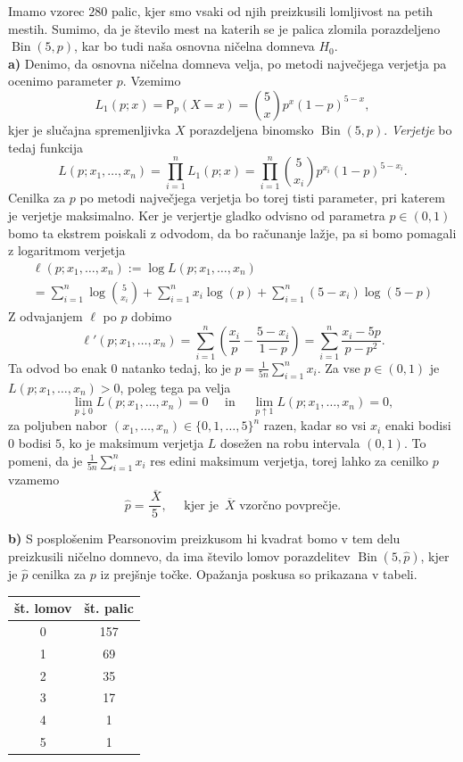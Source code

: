 \documentclass[a4paper,11pt]{article}
\newcommand{\olsi}[1]{\,\overline{\!{#1}}} %
\newcommand{\sumin}{\sum_{i = 1}^n}
\DeclareMathOperator{\bin}{Bin}
\begin{document}
Imamo vzorec $280$ palic, kjer smo vsaki od njih preizkusili lomljivost na petih mestih. Sumimo, da je število mest na katerih se je palica zlomila porazdeljeno $\bin(5,p)$, kar bo tudi naša osnovna ničelna domneva $H_0$.
\\

\noindent
\textbf{a)} Denimo, da osnovna ničelna domneva velja, po metodi največjega verjetja pa ocenimo parameter $p$. Vzemimo
\[
    L_1(p; x) = \mathsf{P}_p(X = x) = \binom{5}{x}p^x(1-p)^{5 - x},
\]
kjer je slučajna spremenljivka $X$ porazdeljena binomsko $\bin(5,p)$. \emph{Verjetje} bo tedaj funkcija
\[
    L(p; x_1, \ldots, x_n) = \prod_{i = 1}^n L_1(p; x) = \prod_{i = 1}^n \binom{5}{x_i}p^{x_i}(1-p)^{5 - x_i}.
\]
Cenilka za $p$ po metodi največjega verjetja bo torej tisti parameter, pri katerem je verjetje maksimalno. Ker je verjertje gladko odvisno od parametra $p \in (0,1)$ bomo ta ekstrem poiskali z odvodom, da bo računanje lažje, pa si bomo pomagali z logaritmom verjetja
\begin{multline*}
    \ell(p; x_1, \ldots, x_n) := 
    \log L(p; x_1, \ldots, x_n) \\ 
    = \sumin \log\binom{5}{x_i} + \sumin x_i\log(p) + \sumin(5 - x_i) \log(5 - p)
\end{multline*}
Z odvajanjem $\ell$ po $p$ dobimo
\[
    \ell'(p; x_1, \ldots, x_n) =
    \sumin \left( \frac{x_i}{p} - \frac{5 - x_i}{1 - p}\right) = 
    \sumin \frac{x_i - 5p}{p - p^2}.
\]
Ta odvod bo enak $0$ natanko tedaj, ko je $p = \frac{1}{5n} \sumin x_i$. Za vse $p \in (0,1)$ je $L(p; x_1, \ldots, x_n) > 0$, poleg tega pa velja
\[
    \lim_{p \downarrow  0} L(p; x_1, \ldots, x_n) = 0 \quad \text{ in } \quad 
    \lim_{p \uparrow  1} L(p; x_1, \ldots, x_n) = 0,
\]
za poljuben nabor $(x_1, \ldots, x_n) \in \{0,1,\ldots, 5\}^n$ razen, kadar so vsi $x_i$ enaki bodisi $0$ bodisi $5$, ko je maksimum verjetja $L$ dosežen na robu intervala $(0,1)$. To pomeni, da je $\frac{1}{5n} \sumin x_i$ res edini maksimum verjetja, torej lahko za cenilko $p$ vzamemo  
\[
    \hat{p} = \frac{\olsi{X}}{5}, \quad \text{ kjer je $\olsi{X}$ vzorčno povprečje.}  
\]

\noindent
\textbf{b)} S posplošenim Pearsonovim preizkusom hi kvadrat \cite[\S 9.5]{Rice} bomo v tem delu preizkusili ničelno domnevo, da ima število lomov porazdelitev $\bin(5,\hat{p})$, kjer je $\hat{p}$ cenilka za $p$ iz prejšnje točke. Opažanja poskusa so prikazana v tabeli. 
\begin{center}
\begin{tabular}{|| c | c ||}
    \hline
    št. lomov & št. palic \\
    \hline 
    \hline 
    0 & 157 \\
    \hline
    1 & 69 \\
    \hline
    2 & 35 \\
    \hline
    3 & 17 \\
    \hline
    4 & 1 \\
    \hline
    5 & 1 \\
    \hline
\end{tabular}
\end{center}
\end{document}
